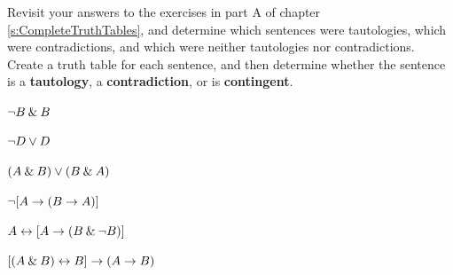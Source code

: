 \problempart
Revisit your answers to the exercises in part A of chapter \ref{s:CompleteTruthTables}, and determine which sentences were tautologies, which were contradictions, and which were neither tautologies nor contradictions.\\


\problempart Create a truth table for each sentence, and then determine whether the sentence is a \textbf{tautology}, a \textbf{contradiction}, or is \textbf{contingent}.

\begin{earg}
\item ${\neg} B \mathbin{\&} B$ \vspace{.5ex}%
\item ${\neg} D \vee D$ \vspace{.5ex}%
\item $(A\mathbin{\&} B) \vee (B\mathbin{\&} A)$\vspace{.5ex} %
\item ${\neg}[A \rightarrow (B \rightarrow A)]$\vspace{.5ex} %
\item $A \leftrightarrow [A \rightarrow (B \mathbin{\&} {\neg} B)]$ \vspace{.5ex}%
\item $[(A \mathbin{\&} B) \leftrightarrow B] \rightarrow (A \rightarrow B)$ \vspace{.5ex}%
\end{earg}


